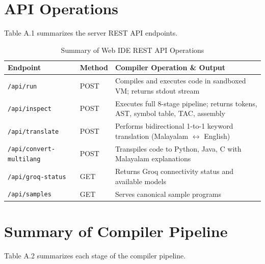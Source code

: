 \documentclass[12pt,a4paper]{report}
\begin{document}
\section{API Operations}
Table A.1 summarizes the server REST API endpoints.

\begin{table}[htbp]
    \centering
    \caption{Summary of Web IDE REST API Operations}
    \label{tab:api_summary}
    \vspace{0.2cm}
    \begin{tabularx}{\textwidth}{llX}
        \toprule
        \textbf{Endpoint} & \textbf{Method} & \textbf{Compiler Operation \& Output} \\
        \midrule
        \texttt{/api/run} & POST & Compiles and executes code in sandboxed VM; returns stdout stream \\
        \texttt{/api/inspect} & POST & Executes full 8-stage pipeline; returns tokens, AST, symbol table, TAC, assembly \\
        \texttt{/api/translate} & POST & Performs bidirectional 1-to-1 keyword translation (Malayalam $\leftrightarrow$ English) \\
        \texttt{/api/convert-multilang} & POST & Transpiles code to Python, Java, C with Malayalam explanations \\
        \texttt{/api/groq-status} & GET & Returns Groq connectivity status and available models \\
        \texttt{/api/samples} & GET & Serves canonical sample programs \\
        \bottomrule
    \end{tabularx}
\end{table}

\section{Summary of Compiler Pipeline}
Table A.2 summarizes each stage of the compiler pipeline.
\end{document}

